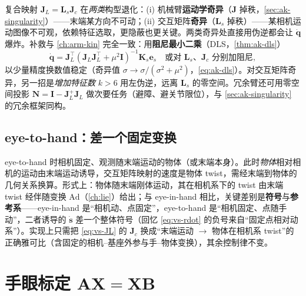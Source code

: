 \begin{insight}\label{insight:vs-double-singular}
复合映射 $\mathbf{J}_L=\mathbf{L}_s\mathbf{J}_c$ 在\emph{两类}构型退化\cite{siciliano2009robotics}：(i) 机械臂\textbf{运动学奇异}（$\mathbf{J}$ 掉秩，\cref{sec:ak-singularity}）——末端某方向不可动；(ii) 交互矩阵\textbf{奇异}（$\mathbf{L}_s$ 掉秩）——某相机运动图像不可观，依赖特征选取，更隐蔽也更关键。两类奇异处直接用伪逆都会让 $\dot{\mathbf{q}}$ 爆炸。补救与 \cref{ch:arm-kin} 完全一致：用\textbf{阻尼最小二乘}（DLS，\cref{thm:ak-dls}）
\begin{equation}
  \dot{\mathbf{q}}=\mathbf{J}_L^\top(\mathbf{J}_L\mathbf{J}_L^\top+\mu^2\mathbf{I})^{-1}\mathbf{K}_s\mathbf{e}_s
  \quad\text{或对 }\mathbf{L}_s\text{、}\mathbf{J}_c\text{ 分别加阻尼},
  \label{eq:vs-dls}
\end{equation}
以少量精度换数值稳定（奇异值 $\sigma\to\sigma/(\sigma^2+\mu^2)$，\cref{eq:ak-dls}）。对交互矩阵奇异，另一招是\emph{增加特征数} $k>6$ 用左伪逆，远离 $\mathbf{L}_s$ 的零空间\cite{siciliano2009robotics}。冗余臂还可用零空间投影 $\mathbf{N}=\mathbf{I}-\mathbf{J}_L^{+}\mathbf{J}_L$ 做次要任务（避障、避关节限位），与 \cref{sec:ak-singularity} 的冗余框架同构。
\end{insight}

\subsection{eye-to-hand：差一个固定变换}
\label{sec:vs-robot-eth}

eye-to-hand 时相机固定、观测随末端运动的物体（或末端本身）。此时\emph{物体}相对相机的运动由末端运动诱导，交互矩阵映射的速度是物体 twist，需经末端到物体的几何关系换算\cite{siciliano2009robotics,chaumette2007visual}。形式上：物体随末端刚体运动，其在相机系下的 twist 由末端 twist 经伴随变换 $\mathrm{Ad}$（\cref{ch:lie}）给出；与 eye-in-hand 相比，关键差别是\textbf{符号}与\textbf{参考系}——eye-in-hand 是“相机动、点固定”，eye-to-hand 是“相机固定、点随手动”，二者诱导的 $\dot{\mathbf{s}}$ 差一个整体符号（回忆 \cref{eq:vs-rdot} 的负号来自“固定点相对动系”）。实现上只需把 \cref{eq:vs-JL} 的 $\mathbf{J}_c$ 换成“末端运动 $\to$ 物体在相机系 twist”的正确雅可比（含固定的相机--基座外参与手--物体变换），其余控制律不变。

\section{手眼标定 \texorpdfstring{$\mathbf{A}\mathbf{X}=\mathbf{X}\mathbf{B}$}{AX=XB}}
\label{sec:vs-handeye}

